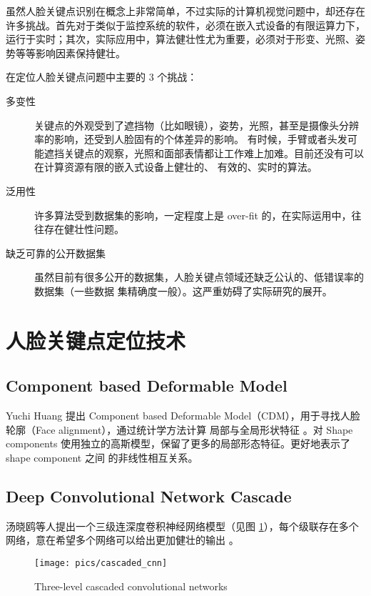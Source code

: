 \documentclass{ctexart}
\begin{document}
虽然人脸关键点识别在概念上非常简单，不过实际的计算机视觉问题中，却还存在许多挑战。首先对于类似于监控系统的软件，必须在嵌入式设备的有限运算力下，运行于实时；其次，实际应用中，算法健壮性尤为重要，必须对于形变、光照、姿势等等影响因素保持健壮。

在定位人脸关键点问题中主要的 3 个挑战：

\begin{description}
	\item[多变性] 关键点的外观受到了遮挡物（比如眼镜），姿势，光照，甚至是摄像头分辨率的影响，还受到人脸固有的个体差异的影响。
	有时候，手臂或者头发可能遮挡关键点的观察，光照和面部表情都让工作难上加难。目前还没有可以在计算资源有限的嵌入式设备上健壮的、
	有效的、实时的算法。
	\item[泛用性] 许多算法受到数据集的影响，一定程度上是 over-fit 的，在实际运用中，往往存在健壮性问题。
	\item[缺乏可靠的公开数据集] 虽然目前有很多公开的数据集，人脸关键点领域还缺乏公认的、低错误率的数据集（一些数据
	集精确度一般）。这严重妨碍了实际研究的展开。
\end{description}

\section{人脸关键点定位技术}

\subsection{Component based Deformable Model}

Yuchi Huang 提出 Component based Deformable Model（CDM），用于寻找人脸轮廓（Face alignment），通过统计学方法计算
局部与全局形状特征 \cite{cdm}。对 Shape components 使用独立的高斯模型，保留了更多的局部形态特征。更好地表示了 shape component 之间
的非线性相互关系。

\subsection{Deep Convolutional Network Cascade}

汤晓鸥等人提出一个三级连深度卷积神经网络模型（见图 \ref{fig:cascaded_cnn}），每个级联存在多个网络，意在希望多个网络可以给出更加健壮的输出 \cite{cascaded_cnn}。

\begin{figure}
\centering
\texttt{[image: pics/cascaded\_cnn]}
\caption[]{Three-level cascaded convolutional networks}
\label{fig:cascaded_cnn}
\end{figure}
\end{document}
